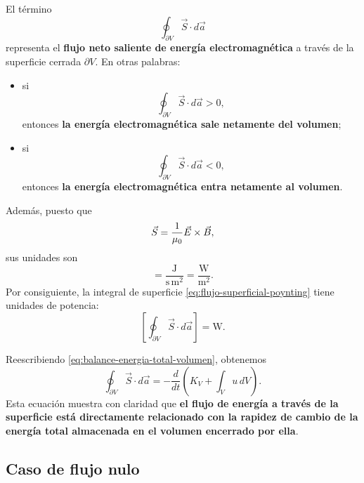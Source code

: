\documentclass[../main.tex]{subfiles}
\begin{document}
El término
\begin{equation}
    \oint_{\partial V}\vec S\cdot d\vec a
    \label{eq:flujo-superficial-poynting}
\end{equation}
representa el \textbf{flujo neto saliente de energía electromagnética} a través de la superficie cerrada $\partial V$. En otras palabras:

\begin{itemize}
    \item si
    \begin{equation*}
        \oint_{\partial V}\vec S\cdot d\vec a>0,
    \end{equation*}
    entonces \textbf{la energía electromagnética sale netamente del volumen};

    \item si
    \begin{equation*}
        \oint_{\partial V}\vec S\cdot d\vec a<0,
    \end{equation*}
    entonces \textbf{la energía electromagnética entra netamente al volumen}.
\end{itemize}

Además, puesto que
\begin{equation*}
    \vec S=\frac{1}{\mu_0}\vec{E}\times\vec{B},
\end{equation*}
sus unidades son
\begin{equation*}
    [\vec S]=\frac{\mathrm{J}}{\mathrm{s}\,\mathrm{m}^2}
    =\frac{\mathrm{W}}{\mathrm{m}^2}.
\end{equation*}
Por consiguiente, la integral de superficie \eqref{eq:flujo-superficial-poynting} tiene unidades de potencia:
\begin{equation*}
    \left[\oint_{\partial V}\vec S\cdot d\vec a\right]=\mathrm{W}.
\end{equation*}

Reescribiendo \eqref{eq:balance-energia-total-volumen}, obtenemos
\begin{equation*}
    \oint_{\partial V}\vec S\cdot d\vec a
    =
    -\frac{d}{dt}\left(
        K_V+\int_V u\,dV
    \right).
\end{equation*}
Esta ecuación muestra con claridad que \textbf{el flujo de energía a través de la superficie está directamente relacionado con la rapidez de cambio de la energía total almacenada en el volumen encerrado por ella}.

\subsection*{Caso de flujo nulo}
\end{document}
